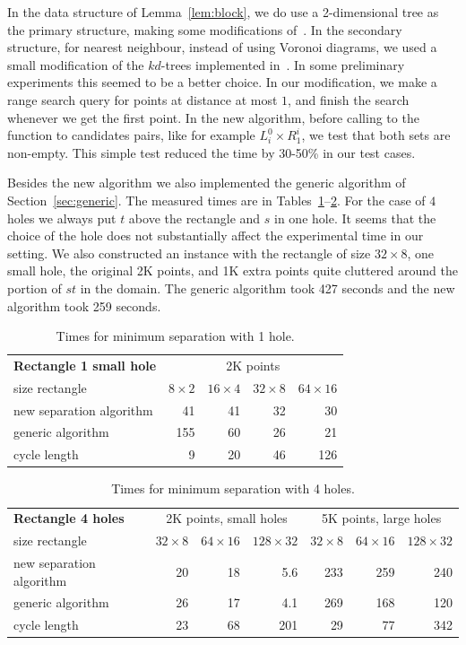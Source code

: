 \documentclass[a4paper,11pt]{article}
\begin{document}
In the data structure of Lemma~\ref{lem:block},
we do use a 2-dimensional tree as the primary structure, making some modifications
of~\cite{cgal:n-rstd-15a}. In the secondary structure, for nearest neighbour, 
instead of using Voronoi diagrams, we used a small modification of
the $kd$-trees implemented in~\cite{cgal:tf-ssd-15a}. 
In some preliminary experiments this seemed to be a better choice.
In our modification, we make a range search query for points at distance at most $1$,
and finish the search whenever we get the first point.
%
In the new algorithm, before calling to the function to candidates pairs, like for example $L_i^0\times R^i_1$,
we test that both sets are non-empty. This simple test reduced the time by 30-50\%
in our test cases.

Besides the new algorithm we also implemented the generic algorithm of Section~\ref{sec:generic}.
The measured times are in Tables~\ref{table6}--\ref{table7}.
For the case of $4$ holes we always put $t$ above the rectangle and $s$ in one hole. 
It seems that the choice of the hole does not substantially affect the experimental time in our setting.
We also constructed an instance with the rectangle of size $32\times 8$, one small hole,
the original 2K points, and 1K extra points quite cluttered
around the portion of $st$ in the domain. The generic algorithm took 427 seconds and the new
algorithm took 259 seconds. 


\begin{table}[ht]
\begin{tabular}{l*{4}{r}}
\textbf{Rectangle 1 small hole} & \multicolumn{4}{c}{2K points}\\
size rectangle	&	$8\times 2$	&	$16\times 4$	&	$32\times 8$ & $64\times 16$ \\	
\hline
new separation algorithm	&	41	&	41	&	32	&	30  \\
generic algorithm			&	155	&	60	&	26	&	21 \\
cycle length				&   9   &   20  &   46  &   126
\end{tabular}
\caption{Times for minimum separation with 1 hole.}
\label{table6}
\end{table}

\begin{table}[ht]
\begin{tabular}{l*{3}{r}|*{3}{r}}
\textbf{Rectangle 4 holes} & \multicolumn{3}{c|}{2K points, small holes} & \multicolumn{3}{c}{5K points, large holes}\\
size rectangle	&	$32\times 8$ &	$64\times 16$ & $128\times 32$ & $32\times 8$ &	$64\times 16$ & $128\times 32$\\	
\hline
new separation algorithm	&	20	&	18	&	5.6	&	233 & 259 & 240  \\
generic algorithm			&	26	&	17	&	4.1	&	269 & 168 & 120 \\
cycle length				&	23  &   68	&	201 &	29	& 77  & 342 
\end{tabular}
\caption{Times for minimum separation with 4 holes.}
\label{table7}
\end{table}




\end{document}
